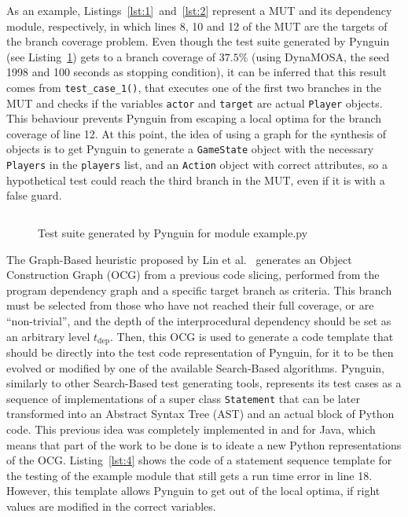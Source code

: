 \documentclass[%
  chapterprefix=false,%
  open=right,%
  twoside=true,%
  paper=a4,%
  logofile={Figures/logo.png},%
  thesistype=master,%
  UKenglish,%
]{se2thesis}
\newcommand{\classname}[1]{\texttt{#1}}
\begin{document}
As an example, Listings~\ref{lst:1}~and~\ref{lst:2} represent a MUT and its dependency module, respectively, in which lines 8, 10 and 12 of the MUT are the targets of the branch coverage problem.
Even though the test suite generated by Pynguin (see Listing~\ref{lst:3}) gets to a branch coverage of \(37.5\%\) (using DynaMOSA, the seed 1998 and 100 seconds as stopping condition), it can be inferred that this result comes from \verb|test_case_1()|, that executes one of the first two branches in the MUT and checks if the variables \verb|actor| and \verb|target| are actual \verb|Player| objects.
This behaviour prevents Pynguin from escaping a local optima for the branch coverage of line 12.
At this point, the idea of using a graph for the synthesis of objects is to get Pynguin to generate a \verb|GameState| object with the necessary \verb|Players| in the \verb|players| list, and an \verb|Action| object with correct attributes, so a hypothetical test could reach the third branch in the MUT, even if it is with a false guard.
  
\begin{figure}
    \inputminted[linenos]{python}{Figures/test1.py}
    \caption{Test suite generated by Pynguin for module example.py\label{lst:3}}
\end{figure}

The Graph-Based heuristic proposed by Lin et al.~\cite{DBLP:conf/sigsoft/0001O00D21} generates an Object Construction Graph (OCG) from a previous code slicing, performed from the program dependency graph and a specific target branch as criteria.
This branch must be selected from those who have not reached their full coverage, or are ``non-trivial'', and the depth of the interprocedural dependency should be set as an arbitrary level $t_{\text{dep}}$.
Then, this OCG is used to generate a code template that should be directly into the test code representation of Pynguin, for it to be then evolved or modified by one of the available Search-Based algorithms.
Pynguin, similarly to other Search-Based test generating tools, represents its test cases as a sequence of implementations of a super class \classname{Statement} that can be later transformed into an Abstract Syntax Tree (AST) and an actual block of Python code.
This previous idea was completely implemented in and for Java, which means that part of the work to be done is to ideate a new Python representations of the OCG.\@
Listing~\ref{lst:4} shows the code of a statement sequence template for the testing of the example module that still gets a run time error in line 18.
However, this template allows Pynguin to get out of the local optima, if right values are modified in the correct variables.
\end{document}
